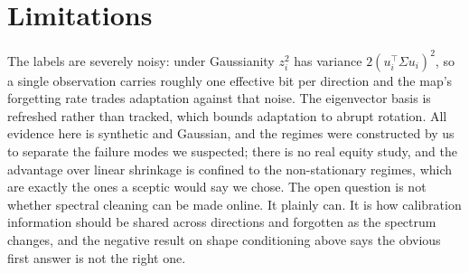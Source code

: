 \documentclass[11pt]{article}
\begin{document}
\section{Limitations}

The labels are severely noisy: under Gaussianity $z_i^2$ has variance $2(u_i^\top \Sigma u_i)^2$, so
a single observation carries roughly one effective bit per direction and the map's forgetting rate
trades adaptation against that noise. The eigenvector basis is refreshed rather than tracked, which
bounds adaptation to abrupt rotation. All evidence here is synthetic and Gaussian, and the regimes were
constructed by us to separate the failure modes we suspected; there is no real equity study, and
the advantage over linear shrinkage is confined to the non-stationary regimes, which are exactly the
ones a sceptic would say we chose. The open question is not whether spectral cleaning can be made online. It plainly
can. It is how calibration information should be shared across directions and forgotten as the
spectrum changes, and the negative result on shape conditioning above says the obvious first answer
is not the right one.



\end{document}
